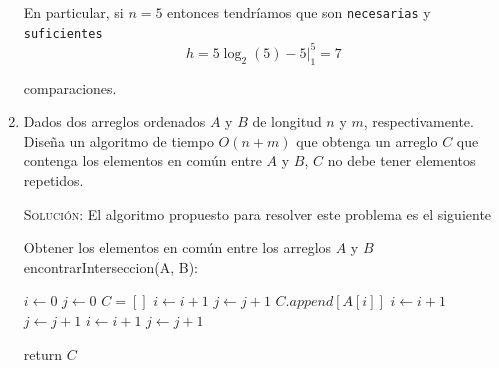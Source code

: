 \documentclass[letterpaper,11pt]{article}
\begin{document}
\begin{enumerate}
    En particular, si $n = 5$ entonces tendríamos que son \texttt{necesarias} y 
    \texttt{suficientes}
    \begin{equation*}
        h = 5 \log_2 (5) - 5 \Big|_1^5 = 7
    \end{equation*} 
    
    comparaciones.

    \newpage
    \item Dados dos arreglos ordenados $A$ y $B$ de longitud $n$ y $m$, 
    respectivamente. Diseña un algoritmo de tiempo $O(n + m)$ que obtenga un 
    arreglo $C$ que contenga los elementos en común entre $A$ y $B$, $C$ no 
    debe tener elementos repetidos.

    \textsc{Solución:} El algoritmo propuesto para resolver este problema es 
    el siguiente
    \begin{center}
    \begin{minipage}[c]{0.7\textwidth}
    \begin{algorithm}[H]
        \caption{Obtener los elementos en común entre los arreglos $A$ y $B$ \\
                 encontrarInterseccion(A, B): } 
        \begin{algorithmic}[1]
            \State $i \gets 0$
            \State $j \gets 0$
            \State $C = []$
                        \State $i \gets i + 1$
                        \State $j \gets j + 1$
                    \Else
                        \State $C.append[A[i]]$
                        \State $i \gets i + 1$
                        \State $j \gets j + 1$
                    \EndIf
                \Else {}
                    \State $i \gets i + 1$
                \Else
                    \State $j \gets j + 1$
                \EndIf
                \EndIf
            \EndWhile

            \State return $C$
        \end{algorithmic} 
    \end{algorithm}
    \end{minipage}
    \end{center}
   

\end{enumerate}
\end{document}
